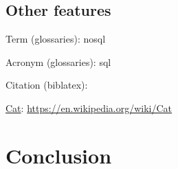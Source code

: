 \subsection{Other features}

Term (glossaries): \gls{nosql}

Acronym (glossaries): \gls{sql}

Citation (biblatex): \cite{paper_millwheel}

\href{https://en.wikipedia.org/wiki/Cat}{Cat}:
\url{https://en.wikipedia.org/wiki/Cat}

\section{Conclusion}

\blindtext

